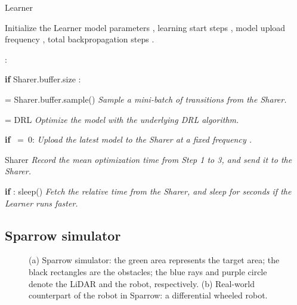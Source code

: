 \documentclass[journal]{IEEEtran}
\begin{document}
\begin{algorithm}[!t]
	\caption{Learner}
	\begin{algorithmic}
		\STATE Initialize the Learner model parameters , learning start steps , model upload frequency , total backpropagation steps .
		
		 :
		
		\STATE \hspace{0.5cm} {\textbf{if}} Sharer.buffer.size  :
		
		\STATE \hspace{1cm}   = Sharer.buffer.sample() \hspace{0.2cm}  \textit{Sample a mini-batch of transitions from the Sharer. }
		
		\STATE \hspace{0.95cm}   = DRL \hspace{0.2cm}  \textit{Optimize the model with the underlying DRL algorithm. }
		
		\STATE \hspace{1cm}  \textbf{if} \ =\ 0:  \hspace{0.2cm}  \textit{Upload the latest model to the Sharer at a fixed frequency . }
		
		\STATE \hspace{0.95cm}   Sharer \hspace{0.2cm}  \textit{Record the mean optimization time from Step 1 to 3, and send it to the Sharer.}
		
		\STATE \hspace{0.98cm}  \textbf{if}  : sleep() \hspace{0.2cm}  \textit{Fetch the relative time from the Sharer, and sleep for  seconds if the Learner runs faster.}		
		
		\STATE \hspace{0.94cm}  
		
	\end{algorithmic}
\end{algorithm}


\subsection{Sparrow simulator}

\begin{figure}
	\centering
	\hfil
	\caption{(a) Sparrow simulator: the green area represents the target area; the black rectangles are the obstacles; the blue rays and purple circle denote the LiDAR and the robot, respectively. (b) Real-world counterpart of the robot in Sparrow: a differential wheeled robot.}
	\label{S&R}
\end{figure}
\end{document}
